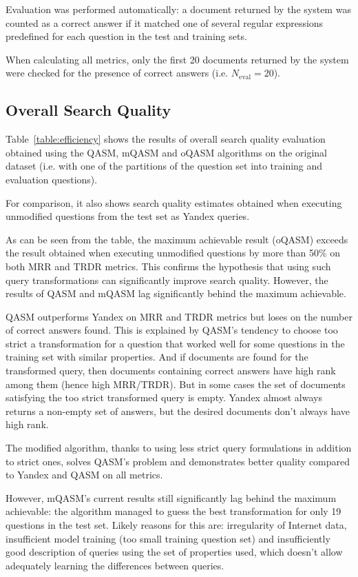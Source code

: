 \documentclass{article}
\begin{document}
Evaluation was performed automatically:
a document returned by the system was counted as a correct answer
if it matched one of several regular expressions predefined for each
question in the test and training sets.

When calculating all metrics, only the first 20 documents returned by the system
were checked for the presence of correct answers
(i.e. $N_{\text{eval}}=20$).

\subsection{Overall Search Quality}

Table~\ref{table:efficiency} shows the results of overall search quality evaluation
obtained using the QASM, mQASM and oQASM algorithms
on the original dataset
(i.e. with one of the partitions of the question set into training and evaluation questions).

For comparison, it also shows search quality estimates
obtained when executing unmodified questions from the test set as Yandex queries.

As can be seen from the table, the maximum achievable result (oQASM)
exceeds the result obtained when executing unmodified questions
by more than 50\% on both MRR and TRDR metrics.
This confirms the hypothesis that using such query transformations
can significantly improve search quality.
However, the results of QASM and mQASM lag significantly behind the maximum achievable.

QASM outperforms Yandex on MRR and TRDR metrics but loses on the number of correct answers found. This
is explained by QASM's tendency to choose too strict a transformation for a question that worked well for some questions
in the training set with similar properties. And if documents are found for the transformed
query, then documents containing correct answers have high rank among them (hence high MRR/TRDR). But in some
cases the set of documents satisfying the too strict transformed query is empty. Yandex almost always returns a non-empty
set of answers, but the desired documents don't always have high rank.

The modified algorithm, thanks to using
less strict query formulations in addition to strict ones,
solves QASM's problem and demonstrates better
quality compared to Yandex and QASM on all metrics.

However, mQASM's current results still significantly lag behind the maximum
achievable: the algorithm managed to guess the best transformation for only
19 questions in the test set. Likely reasons for this are:
irregularity of Internet data, insufficient model training (too
small training question set) and insufficiently good
description of queries using the set of properties used, which doesn't allow
adequately learning the differences between queries.
\end{document}

